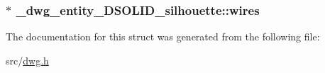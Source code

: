 \hypertarget{struct__dwg__entity__3DSOLID__silhouette_a3949cb1a6c32bce4702ccb9980c0198e}{
\subsubsection[{wires}]{$\ast$ {\bf \-\_\-dwg\-\_\-entity\-\_\-D\-S\-O\-L\-I\-D\-\_\-silhouette\-::wires}}}\label{struct__dwg__entity__3DSOLID__silhouette_a3949cb1a6c32bce4702ccb9980c0198e}


\-The documentation for this struct was generated from the following file\-:\begin{DoxyCompactItemize}
\item 
src/\hyperlink{dwg_8h}{dwg.\-h}\end{DoxyCompactItemize}
